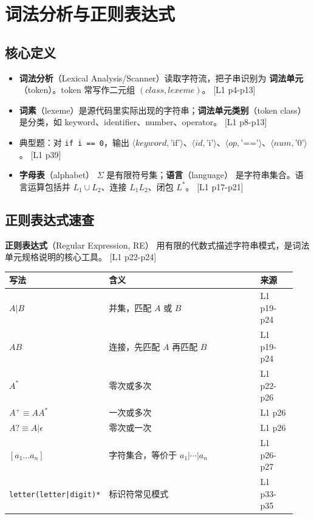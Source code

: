 \documentclass[UTF8,fontset=none,11pt]{ctexart}
\newcommand{\pg}[1]{{\scriptsize\textcolor{citegray}{[#1]}}}
\newcommand{\term}[2]{\textbf{#1}（#2）}
\newcommand{\code}[1]{\texttt{#1}}
\begin{document}
\section{词法分析与正则表达式}

\subsection{核心定义}

\begin{itemize}
  \item \term{词法分析}{Lexical Analysis/Scanner}读取字符流，把子串识别为 \term{词法单元}{token}。token 常写作二元组 \((\textit{class},\textit{lexeme})\)。 \pg{L1 p4-p13}
  \item \term{词素}{lexeme}是源代码里实际出现的字符串；\term{词法单元类别}{token class}是分类，如 keyword、identifier、number、operator。 \pg{L1 p8-p13}
  \item 典型题：对 \code{if i == 0}，输出 \(\langle keyword,\text{'if'}\rangle\)、\(\langle id,\text{'i'}\rangle\)、\(\langle op,\text{'=='}\rangle\)、\(\langle num,\text{'0'}\rangle\)。 \pg{L1 p39}
  \item \term{字母表}{alphabet} \(\Sigma\) 是有限符号集；\term{语言}{language} 是字符串集合。语言运算包括并 \(L_1\cup L_2\)、连接 \(L_1L_2\)、闭包 \(L^*\)。 \pg{L1 p17-p21}
\end{itemize}

\subsection{正则表达式速查}

\term{正则表达式}{Regular Expression, RE} 用有限的代数式描述字符串模式，是词法单元规格说明的核心工具。 \pg{L1 p22-p24}

\begin{longtable}{p{0.26\linewidth}p{0.55\linewidth}p{0.13\linewidth}}
\toprule
写法 & 含义 & 来源 \\
\midrule
\(A|B\) & 并集，匹配 \(A\) 或 \(B\) & L1 p19-p24 \\
\(AB\) & 连接，先匹配 \(A\) 再匹配 \(B\) & L1 p19-p24 \\
\(A^*\) & 零次或多次 & L1 p22-p26 \\
\(A^+ \equiv AA^*\) & 一次或多次 & L1 p26 \\
\(A? \equiv A|\epsilon\) & 零次或一次 & L1 p26 \\
\([a_1\ldots a_n]\) & 字符集合，等价于 \(a_1|\cdots|a_n\) & L1 p26-p27 \\
\code{letter(letter|digit)*} & 标识符常见模式 & L1 p33-p35 \\
\bottomrule
\end{longtable}
\end{document}
